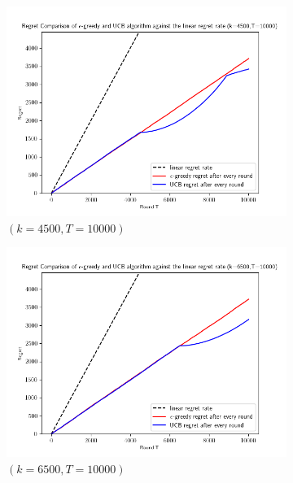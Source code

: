 \documentclass[12pt]{article}
\begin{document}
\begin{enumerate}
\begin{figure}[h!]
				\begin{subfigure}[b]{0.3\textwidth}
					\centering
					\includegraphics[width=\textwidth]{fig7.png}
					\caption{$(k=4500, T=10000)$}
				\end{subfigure}
				\hfill
				\begin{subfigure}[b]{0.3\textwidth}
					\centering
					\includegraphics[width=\textwidth]{fig8.png}
					\caption{$(k=6500, T=10000)$}
				\end{subfigure}
				\hfill
				\begin{subfigure}[b]{0.3\textwidth}
					\centering

\end{subfigure}
\end{figure}
\end{enumerate}
\end{document}
